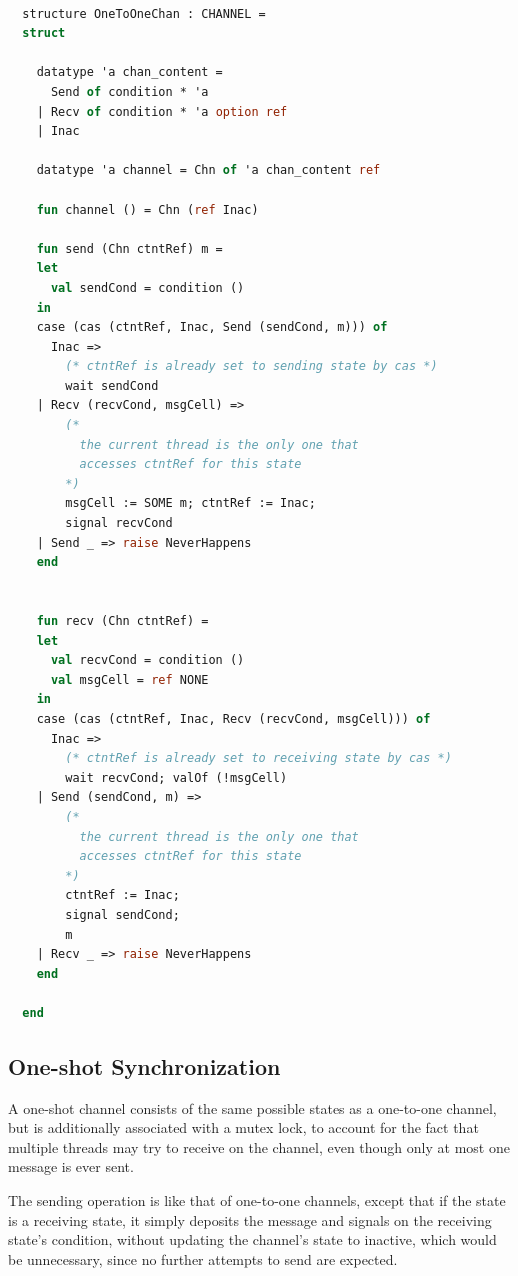 \documentclass[letterpaper, 11pt]{extarticle}
\begin{document}
\begin{lstlisting}[language=ML, mathescape]

  structure OneToOneChan : CHANNEL =
  struct

    datatype 'a chan_content =
      Send of condition * 'a
    | Recv of condition * 'a option ref
    | Inac  

    datatype 'a channel = Chn of 'a chan_content ref

    fun channel () = Chn (ref Inac)

    fun send (Chn ctntRef) m =
    let
      val sendCond = condition ()
    in
    case (cas (ctntRef, Inac, Send (sendCond, m))) of
      Inac => 
        (* ctntRef is already set to sending state by cas *)
        wait sendCond
    | Recv (recvCond, msgCell) =>
        (*
          the current thread is the only one that
          accesses ctntRef for this state
        *)
        msgCell := SOME m; ctntRef := Inac;
        signal recvCond
    | Send _ => raise NeverHappens
    end


    fun recv (Chn ctntRef) =
    let
      val recvCond = condition ()
      val msgCell = ref NONE 
    in
    case (cas (ctntRef, Inac, Recv (recvCond, msgCell))) of
      Inac =>
        (* ctntRef is already set to receiving state by cas *)
        wait recvCond; valOf (!msgCell)
    | Send (sendCond, m) =>
        (*
          the current thread is the only one that
          accesses ctntRef for this state
        *)
        ctntRef := Inac;
        signal sendCond;
        m
    | Recv _ => raise NeverHappens
    end 

  end
\end{lstlisting}

\subsection{One-shot Synchronization}

A one-shot channel consists of the same possible states as a one-to-one channel, but is
additionally associated with a mutex lock, to account for the fact that multiple threads may
try to receive on the channel, even though only at most one message is ever sent.

The sending operation is like that of one-to-one channels,
except that if the state is a receiving state, it simply deposits the message and signals
on the receiving state's condition,
without updating the channel's state to inactive, which would be unnecessary, since
no further attempts to send are expected.
\end{document}
